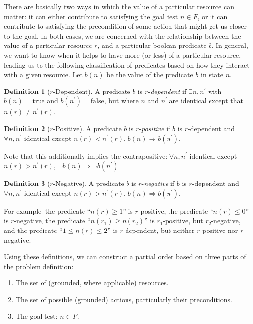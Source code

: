 \documentclass[letterpaper]{article}
\theoremstyle{plain} \newtheorem{theorem}{Theorem} \newtheorem{proposition}{Proposition} \newtheorem{lemma}{Lemma}
\theoremstyle{definition} \newtheorem{definition}{Definition} \newtheorem{conjecture}{Conjecture} \newtheorem*{example}{Example}
\theoremstyle{remark} \newtheorem*{remark}{Remark} \newtheorem*{note}{Note} \newtheorem{case}{Case}
\begin{document}
There are basically two ways in which the value of a particular resource can matter: it can
either contribute to satisfying the goal test $n \in F$, or it can contribute to satisfying
the precondition of some action that might get us closer to the
goal. In both cases, we are
concerned with the relationship between the value of a particular resource $r$, and a
particular boolean predicate $b$. In general, we want to know when it helps to have more (or less) of a particular resource, leading us to the following classification
of predicates based on how they interact with a given resource. Let $b(n)$ be the value of the predicate $b$ in state $n$.
\begin{definition}[$r$-Dependent]
A predicate $b$ is $r$-\textit{dependent} if $\exists n, n^\prime$ with $b(n) = \text{true}$ and $b(n^\prime) = \text{false}$, but where $n$ and $n^\prime$ are identical except that $n(r) \ne n^\prime(r)$.
\end{definition}
\begin{definition}[$r$-Positive]
	A predicate $b$ is $r$-\textit{positive} if $b$ is $r$-dependent and 
	$\forall n, n^\prime$ identical except $n(r) < n^\prime(r)$, $b(n) \Rightarrow b(n^\prime).$
\end{definition}
Note that this additionally implies the contrapositive:
$\forall n, n^\prime$ identical except $n(r) > n^\prime(r)$, $\neg b(n) \Rightarrow \neg b(n^\prime)$
\begin{definition}[$r$-Negative]
	A predicate $b$ is $r$-\textit{negative} if $b$ is $r$-dependent and
	$\forall n, n^\prime$ identical except $n(r) > n^\prime(r)$, $b(n) \Rightarrow b(n^\prime).$
\end{definition}
For example, the predicate ``$n(r) \ge 1$'' is $r$-positive, the predicate ``$n(r) \le 0$'' is $r$-negative, the predicate ``$n(r_1) \ge n(r_2)$'' is $r_1$-positive, but $r_2$-negative, and the predicate ``$1 \le n(r) \le 2$'' is $r$-dependent, but neither $r$-positive nor $r$-negative.

Using these definitions, we can construct a partial order based on three parts of the problem definition:
\begin{enumerate}
	\item The set of (grounded, where applicable) resources.
	\item The set of possible (grounded) actions, particularly their preconditions.
	\item The goal test: $n \in F$.
\end{enumerate}
\end{document}
